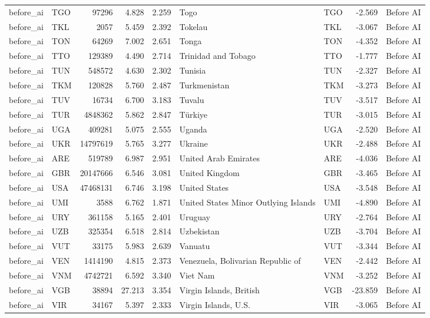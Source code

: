 \begin{tabular}{llrrrllrl}
before\_ai & TGO & 97296 & 4.828 & 2.259 & Togo & TGO & -2.569 & Before AI \\
before\_ai & TKL & 2057 & 5.459 & 2.392 & Tokelau & TKL & -3.067 & Before AI \\
before\_ai & TON & 64269 & 7.002 & 2.651 & Tonga & TON & -4.352 & Before AI \\
before\_ai & TTO & 129389 & 4.490 & 2.714 & Trinidad and Tobago & TTO & -1.777 & Before AI \\
before\_ai & TUN & 548572 & 4.630 & 2.302 & Tunisia & TUN & -2.327 & Before AI \\
before\_ai & TKM & 120828 & 5.760 & 2.487 & Turkmenistan & TKM & -3.273 & Before AI \\
before\_ai & TUV & 16734 & 6.700 & 3.183 & Tuvalu & TUV & -3.517 & Before AI \\
before\_ai & TUR & 4848362 & 5.862 & 2.847 & Türkiye & TUR & -3.015 & Before AI \\
before\_ai & UGA & 409281 & 5.075 & 2.555 & Uganda & UGA & -2.520 & Before AI \\
before\_ai & UKR & 14797619 & 5.765 & 3.277 & Ukraine & UKR & -2.488 & Before AI \\
before\_ai & ARE & 519789 & 6.987 & 2.951 & United Arab Emirates & ARE & -4.036 & Before AI \\
before\_ai & GBR & 20147666 & 6.546 & 3.081 & United Kingdom & GBR & -3.465 & Before AI \\
before\_ai & USA & 47468131 & 6.746 & 3.198 & United States & USA & -3.548 & Before AI \\
before\_ai & UMI & 3588 & 6.762 & 1.871 & United States Minor Outlying Islands & UMI & -4.890 & Before AI \\
before\_ai & URY & 361158 & 5.165 & 2.401 & Uruguay & URY & -2.764 & Before AI \\
before\_ai & UZB & 325354 & 6.518 & 2.814 & Uzbekistan & UZB & -3.704 & Before AI \\
before\_ai & VUT & 33175 & 5.983 & 2.639 & Vanuatu & VUT & -3.344 & Before AI \\
before\_ai & VEN & 1414190 & 4.815 & 2.373 & Venezuela, Bolivarian Republic of & VEN & -2.442 & Before AI \\
before\_ai & VNM & 4742721 & 6.592 & 3.340 & Viet Nam & VNM & -3.252 & Before AI \\
before\_ai & VGB & 38894 & 27.213 & 3.354 & Virgin Islands, British & VGB & -23.859 & Before AI \\
before\_ai & VIR & 34167 & 5.397 & 2.333 & Virgin Islands, U.S. & VIR & -3.065 & Before AI \\

\end{tabular}
